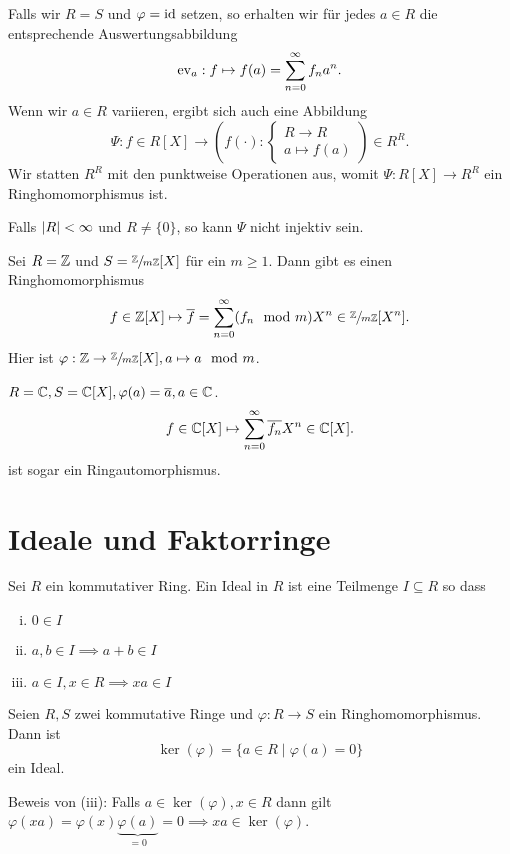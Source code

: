 \begin{eg}
	Falls wir $R = S$ und $\varphi = \operatorname{id}$ setzen, so erhalten wir für jedes $a \in R$ die entsprechende Auswertungsabbildung
	\[
		\operatorname{ev}_{a} : f \mapsto f(a) = \sum_{n=0}^{\infty} f_{n} a^{n}
	.\] 
	Wenn wir $a \in R$ variieren, ergibt sich auch eine Abbildung
	\[
		\Psi: f \in R[X] \to \left(f(\cdot): \begin{cases}
			R \to R\\
			a \mapsto f(a)
		\end{cases}\right) \in R^{R}
	.\]
	Wir statten $R^{R}$ mit den punktweise Operationen aus, womit $\Psi: R[X] \to R^{R}$ ein Ringhomomorphismus ist.
	
	Falls $\abs{R} < \infty$ und $R \neq \{0\}$, so kann $\Psi$ nicht injektiv sein. 
\end{eg}

\begin{eg}
	Sei $R = \mathbb{Z}$ und $S = \sfrac{\mathbb{Z}}{m\mathbb{Z}}[X]$ für ein $m \geq 1$.
	Dann gibt es einen Ringhomomorphismus
	\[
		f \in \mathbb{Z}[X] \mapsto \overline{f} = \sum_{n=0}^{\infty} (f_{n} \mod m) X^{n} \in \sfrac{\mathbb{Z}}{m\mathbb{Z}}[X^{n}]
	.\]
	Hier ist $\varphi: \mathbb{Z} \to \sfrac{\mathbb{Z}}{m\mathbb{Z}} [X], a \mapsto a \mod m$.
\end{eg}

\begin{eg}
	$R = \mathbb{C}, S = \mathbb{C}[X], \varphi(a) = \overline{a}, a \in \mathbb{C}$.
	\[
		f \in \mathbb{C}[X] \mapsto \sum_{n=0}^{\infty} \overline{f_{n}} X^{n} \in \mathbb{C}[X]
	.\] 
	ist sogar ein Ringautomorphismus.
\end{eg}

\section{Ideale und Faktorringe}

\begin{definition}
	Sei $R$ ein kommutativer Ring.
	Ein Ideal in $R$ ist eine Teilmenge $I \subseteq R$ so dass
	\begin{enumerate}[(i)]
		\item $0 \in I$ 
		\item $a,b \in I \implies a + b \in I$
		\item $a \in I, x \in R \implies xa \in I$
	\end{enumerate}
\end{definition}

\begin{eg}
	Seien $R,S$ zwei kommutative Ringe und $\varphi: R \to S$ ein Ringhomomorphismus. Dann ist
	\[
		\ker(\varphi) = \{a \in R \mid \varphi(a) = 0\} 
	\] 
	ein Ideal.

	Beweis von (iii): Falls $a \in \ker(\varphi), x \in R$ dann gilt $\varphi(xa) = \varphi(x) \underbrace{\varphi(a)}_{=0} = 0 \implies  xa \in \ker(\varphi)$.
\end{eg}

